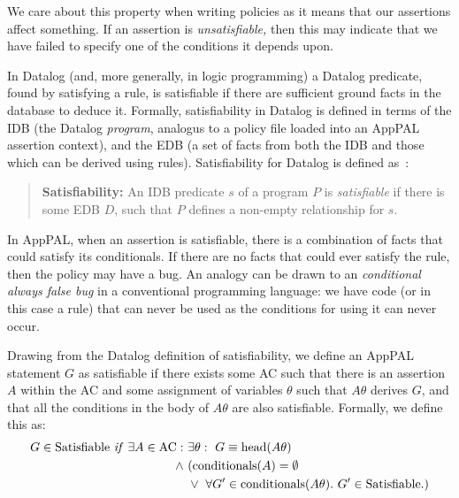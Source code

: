 \documentclass[thesis.tex]{subfiles}
\begin{document}
We care about this
property when writing policies as it means that our assertions affect
something.  If an assertion is \emph{unsatisfiable,} then this may
indicate that we have failed to specify one of the conditions it
depends upon.

In Datalog (and, more generally, in logic programming) a Datalog predicate, found by satisfying a
rule, is satisfiable if there are sufficient ground facts in the database to
deduce it. Formally, satisfiability in Datalog is defined in terms of the \ac{IDB} (the Datalog \emph{program}, analogus to a policy file loaded into an AppPAL assertion context), and the \ac{EDB} (a set of facts from both the \ac{IDB} and those which can be derived using rules).
Satisfiability for Datalog is defined as~\cite{alon_levy_equivalence_1993}:

\begin{quote}
  \textbf{Satisfiability:} An IDB predicate $s$ of a program $P$ is
  \emph{satisfiable} if there is some EDB $D$, such that $P$ defines a
  non-empty relationship for $s$.
\end{quote}

In AppPAL, when an assertion is satisfiable, there is a combination of facts that
could satisfy its conditionals. If there are no facts that could ever
satisfy the rule, then the policy may have a bug. An analogy can be
drawn to an \emph{conditional always false bug} in a conventional
programming language: we have code (or in this case a rule) that can
never be used as the conditions for using it can never occur.

Drawing from the Datalog definition of satisfiability, we define an AppPAL statement $G$ as satisfiable if there exists some \ac{AC} such that there is an assertion $A$ within the AC and some assignment of variables $\theta$ such that $A\theta$ derives $G$, and that all the conditions in the body of $A\theta$ are also satisfiable.  Formally, we define this as:
%
\begin{align*}
  G \in \text{Satisfiable}~\text{\textit{if}}~\exists A \in \text{AC}:~&\exists \theta:~G\equiv\text{head}(A\theta) \\
                                                              \wedge~ & (\text{conditionals}(A) = \emptyset \\
                                                                      & \vee~\forall G^\prime \in \text{conditionals}(A\theta).~G^\prime \in \text{Satisfiable}.)
\end{align*}
\end{document}
